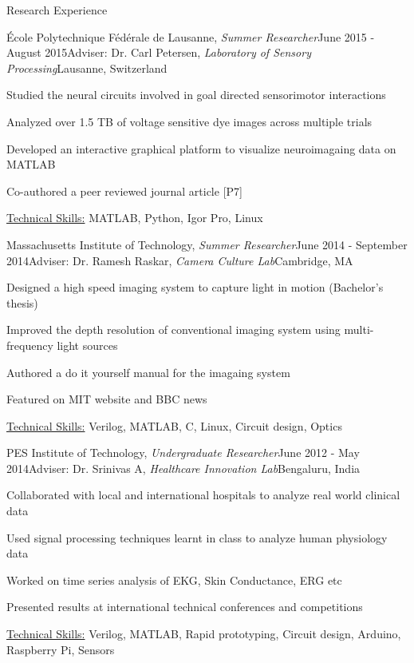 \documentclass{resume}
\begin{document}
\begin{rSection}{Research Experience}
    \begin{rSubsection}{École Polytechnique Fédérale de Lausanne, \textit{Summer Researcher}}{June 2015 - August 2015}{Adviser: Dr. Carl Petersen, \textit{Laboratory of Sensory Processing}}{Lausanne, Switzerland}
\item Studied the neural circuits involved in goal directed sensorimotor interactions
\item Analyzed over 1.5 TB of voltage sensitive dye images across multiple trials
\item Developed an interactive graphical platform to visualize neuroimagaing data on MATLAB
\item Co-authored a peer reviewed journal article [P7]
\item \uline{Technical Skills:} MATLAB, Python, Igor Pro, Linux
    \end{rSubsection}
\newpage
    \begin{rSubsection}{Massachusetts Institute of Technology, \textit{Summer Researcher}}{June 2014 - September 2014}{Adviser: Dr. Ramesh Raskar, \textit{Camera Culture Lab}}{Cambridge, MA}
\item Designed a high speed imaging system to capture light in motion (Bachelor's thesis)
\item Improved the depth resolution of conventional imaging system using multi-frequency light sources
\item Authored a do it yourself manual for the imagaing system
\item Featured on MIT website and BBC news
\item \uline{Technical Skills:} Verilog, MATLAB, C, Linux, Circuit design, Optics
    \end{rSubsection}
    
 \begin{rSubsection}{PES Institute of Technology, \textit{Undergraduate Researcher}}{June 2012 - May 2014}{Adviser: Dr. Srinivas A, \textit{Healthcare Innovation Lab}}{Bengaluru, India}
\item Collaborated with local and international hospitals to analyze real world clinical data
\item Used signal processing techniques learnt in class to analyze human physiology data
\item Worked on time series analysis of EKG, Skin Conductance, ERG etc
\item Presented results at international technical conferences and competitions
\item \uline{Technical Skills:} Verilog, MATLAB, Rapid prototyping, Circuit design, Arduino, Raspberry Pi, Sensors
 \end{rSubsection}
  \end{rSection}
\end{document}
